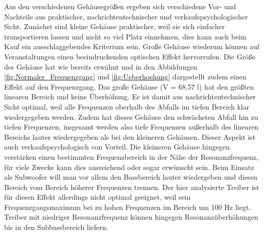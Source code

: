 Aus den verschiedenen Gehäusegrößen ergeben sich verschiedene Vor- und Nachteile aus praktischer, nachrichtentechnischer und verkaufspsychologischer Sicht.
Zunächst sind kleine Gehäuse praktischer, weil sie sich einfacher transportieren lassen und nicht so viel Platz einnehmen, dies kann auch beim Kauf ein ausschlaggebendes Kriterium sein.
Große Gehäuse wiederum können auf Veranstaltungen einen beeindruckenden optischen Effekt hervorrufen. 
Die Größe des Gehäuse hat wie bereits erwähnt und in den Abbildungen \ref{fig:Normaler_Frequenzgang} und \ref{fig:Ueberhoehung} dargestellt zudem einen Effekt auf den Frequenzgang. 
Das große Gehäuse (V = 68,57 l) hat den größten linearen Bereich und keine Überhöhung. 
Es ist damit aus nachrichtentechnischer Sicht optimal, weil alle Frequenzen oberhalb des Abfalls im tiefen Bereich klar wiedergegeben werden. 
Zudem hat dieses Gehäuse den schwächsten Abfall hin zu tiefen Frequenzen, insgesamt werden also tiefe Frequenzen außerhalb des linearen Bereichs lauter wiedergegeben als bei den kleineren Gehäusen.
Dieser Aspekt ist auch verkaufspsychologisch von Vorteil.
Die kleineren Gehäuse hingegen verstärken einen bestimmten Frequenzbereich in der Nähe der Resonanzfrequenz, für viele Zwecke kann dies ausreichend oder sogar erwünscht sein.
Beim Einsatz als Subwoofer will man vor allem den Bassbereich lauter wiedergeben und diesen Bereich vom Bereich höherer Frequenzen trennen.
Der hier analysierte Treiber ist für diesen Effekt allerdings nicht optimal geeignet, weil sein Frequenzgangsmaximum bei zu hohen Frequenzen im Bereich um 100 Hz liegt. 
Treiber mit niedriger Resonanzfrequenz können hingegen Resonanzüberhöhungen bis in den Subbassbereich liefern.
